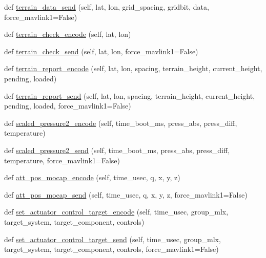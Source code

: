 \begin{DoxyCompactItemize}
def \hyperlink{classpymavlink_1_1dialects_1_1v10_1_1MAVLink_af0a85a38c4ed889e36573288af878227}{terrain\+\_\+data\+\_\+send} (self, lat, lon, grid\+\_\+spacing, gridbit, data, force\+\_\+mavlink1=False)
\item 
def \hyperlink{classpymavlink_1_1dialects_1_1v10_1_1MAVLink_a82dcfb013475db3eb34f7260856f51a2}{terrain\+\_\+check\+\_\+encode} (self, lat, lon)
\item 
def \hyperlink{classpymavlink_1_1dialects_1_1v10_1_1MAVLink_a4df4e4af01ad4912c3cce23737fd026b}{terrain\+\_\+check\+\_\+send} (self, lat, lon, force\+\_\+mavlink1=False)
\item 
def \hyperlink{classpymavlink_1_1dialects_1_1v10_1_1MAVLink_a400e7fdbb568ae238f1004e63a0c8f0a}{terrain\+\_\+report\+\_\+encode} (self, lat, lon, spacing, terrain\+\_\+height, current\+\_\+height, pending, loaded)
\item 
def \hyperlink{classpymavlink_1_1dialects_1_1v10_1_1MAVLink_ad59214aad4f79848933ce6e90f5e9145}{terrain\+\_\+report\+\_\+send} (self, lat, lon, spacing, terrain\+\_\+height, current\+\_\+height, pending, loaded, force\+\_\+mavlink1=False)
\item 
def \hyperlink{classpymavlink_1_1dialects_1_1v10_1_1MAVLink_aefc9175e3276d521bae57dce4efe91c0}{scaled\+\_\+pressure2\+\_\+encode} (self, time\+\_\+boot\+\_\+ms, press\+\_\+abs, press\+\_\+diff, temperature)
\item 
def \hyperlink{classpymavlink_1_1dialects_1_1v10_1_1MAVLink_a1c194cd1db3ce31243b328a082718a51}{scaled\+\_\+pressure2\+\_\+send} (self, time\+\_\+boot\+\_\+ms, press\+\_\+abs, press\+\_\+diff, temperature, force\+\_\+mavlink1=False)
\item 
def \hyperlink{classpymavlink_1_1dialects_1_1v10_1_1MAVLink_a2c3bacbcae08d0a0205416b9ab25e42d}{att\+\_\+pos\+\_\+mocap\+\_\+encode} (self, time\+\_\+usec, q, x, y, z)
\item 
def \hyperlink{classpymavlink_1_1dialects_1_1v10_1_1MAVLink_a0c2076a3e6de6e2fc4f91d547e3352be}{att\+\_\+pos\+\_\+mocap\+\_\+send} (self, time\+\_\+usec, q, x, y, z, force\+\_\+mavlink1=False)
\item 
def \hyperlink{classpymavlink_1_1dialects_1_1v10_1_1MAVLink_a3fb70997e2ab67b47062add4a24e7d66}{set\+\_\+actuator\+\_\+control\+\_\+target\+\_\+encode} (self, time\+\_\+usec, group\+\_\+mlx, target\+\_\+system, target\+\_\+component, controls)
\item 
def \hyperlink{classpymavlink_1_1dialects_1_1v10_1_1MAVLink_abbd1b220e6bb8f5269ef97284d9a6cd4}{set\+\_\+actuator\+\_\+control\+\_\+target\+\_\+send} (self, time\+\_\+usec, group\+\_\+mlx, target\+\_\+system, target\+\_\+component, controls, force\+\_\+mavlink1=False)

\end{DoxyCompactItemize}
